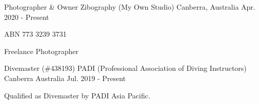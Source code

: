 

\begin{cventries}

  \cventry
    {Photographer \& Owner} %
    {Zibography (My Own Studio)} %
    {Canberra, Australia} %
    {Apr. 2020 - Present} %
    {
      \begin{cvitems} %
      	\item {ABN 773 3239 3731}
        \item {Freelance Photographer}
      \end{cvitems}
    }

  \cventry
    {Divemaster (\#438193)} %
    {PADI (Professional Association of Diving Instructors)} %
    {Canberra Australia} %
    {Jul. 2019 - Present} %
    {
      \begin{cvitems} %
        \item {Qualified as Divemaster by PADI Asia Pacific.}
      \end{cvitems}
    }

\end{cventries}
